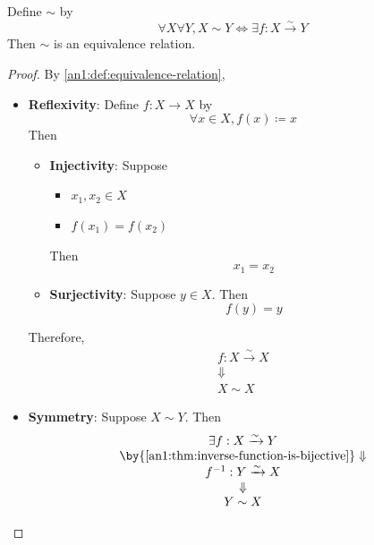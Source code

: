 \begin{theorem} \label{an1:thm:bijection-equivalence-relation}
  Define $\sim$ by
  \[
    \forall X \forall Y, X \sim Y \iff \exists f: X \xrightarrow{\sim} Y
  \]
  Then $\sim$ is an equivalence relation.
\end{theorem}

\begin{proof}
  By \cref{an1:def:equivalence-relation},
  \begin{itemize}
    \item \textbf{Reflexivity}: Define $f: X \to X$ by
          \[
            \forall x \in X, f(x) \coloneqq x
          \]
          Then
          \begin{itemize}
            \item \textbf{Injectivity}: Suppose
                  \begin{itemize}
                    \item $x_{1}, x_{2} \in X$
                    \item $f(x_{1}) = f(x_{2})$
                  \end{itemize}
                  Then
                  \[
                    x_{1} = x_{2}
                  \]
            \item \textbf{Surjectivity}: Suppose $y \in X$. Then
                  \[
                    f(y) = y
                  \]
          \end{itemize}
          Therefore,
          \[
            \begin{array}{c}
              f: X \xrightarrow{\sim} X \\
              \Downarrow                \\
              X \sim X
            \end{array}
          \]
    \item \textbf{Symmetry}: Suppose $X \sim Y$. Then
          \[
            \begin{array}{c}
              \exists f: X \xrightarrow{\sim} Y                            \\
              \by{\Cref{an1:thm:inverse-function-is-bijective}} \Downarrow \\
              f^{-1}: Y \xrightarrow{\sim} X                               \\
              \Downarrow                                                   \\
              Y \sim X
            \end{array}
          \]

\end{itemize}
\end{proof}
